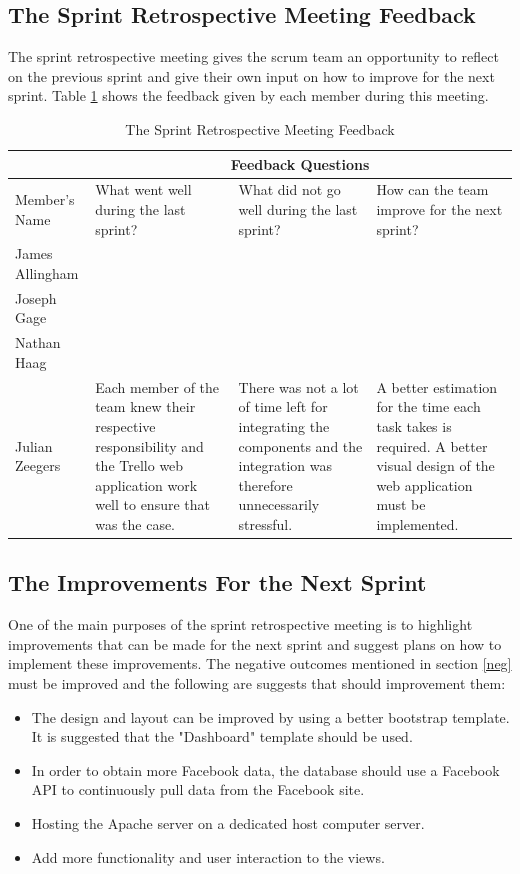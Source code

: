 \documentclass[12pt,onecolumn]{article}
\begin{document}
	\subsection{The Sprint Retrospective Meeting Feedback}
	The sprint retrospective meeting gives the scrum team an opportunity to reflect on the previous sprint and give their own input on how to improve for the next sprint. Table \ref{feedback} shows the feedback given by each member during this meeting.
	
	\begin{table}[h!]
		\caption{The Sprint Retrospective Meeting Feedback\label{feedback}}
		\small
		\begin{tabular}{|>{\centering\arraybackslash}p{1.8cm}|p{4.7cm}|p{4.7cm}|p{4.7cm}|}
			\hline
			\multicolumn{1}{|c|}{}  &  \multicolumn{3}{c|}{Feedback Questions}  \\
			\hline
			Member's Name & What went well during the last sprint? & What did not go well during the last sprint? & How can the team improve for the next sprint? \\
			\hline
			James Allingham & & & \\
			\hline
			Joseph Gage & & & \\
			\hline
			Nathan Haag & & & \\
			\hline
			Julian Zeegers & Each member of the team knew their respective responsibility and the Trello web application work well to ensure that was the case. & There was not a lot of time left for integrating the components and the integration was therefore unnecessarily stressful.   & A better estimation for the time each task takes is required. A better visual design of the web application must be implemented.\\
			\hline
			
			
		\end{tabular}
	\end{table}
	
	
	\subsection{The Improvements For the Next Sprint}
	One of the main purposes of the sprint retrospective meeting is to highlight improvements that can be made for the next sprint and suggest plans on how to implement these improvements. The negative outcomes mentioned in section \ref{neg} must be improved and the following are suggests that should improvement them:
	
	\begin{itemize}
		\item The design and  layout can be improved by using a better bootstrap template. It is suggested that the "Dashboard" template should be used.
		\item In order to obtain more Facebook data, the database should use a Facebook API to continuously pull data from the Facebook site. 
		\item Hosting the Apache server on a dedicated host computer server.
		\item Add more functionality and user interaction to the views.
	\end{itemize}
	
\end{document}
